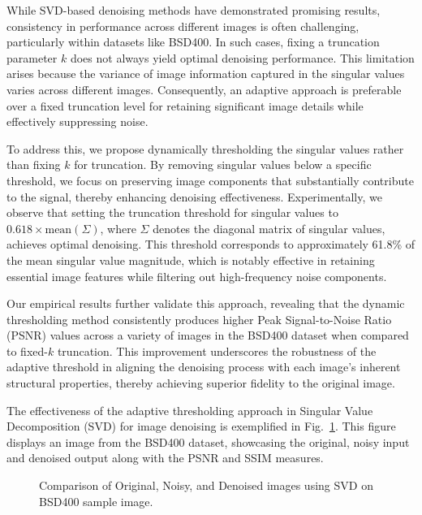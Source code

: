 \documentclass[
  journal,
]{IEEEtran}%
\begin{document}
While SVD-based denoising methods have demonstrated promising results,
consistency in performance across different images is often challenging,
particularly within datasets like BSD400. In such cases, fixing a
truncation parameter \(k\) does not always yield optimal denoising
performance. This limitation arises because the variance of image
information captured in the singular values varies across different
images. Consequently, an adaptive approach is preferable over a fixed
truncation level for retaining significant image details while
effectively suppressing noise.

To address this, we propose dynamically thresholding the singular values
rather than fixing \(k\) for truncation. By removing singular values
below a specific threshold, we focus on preserving image components that
substantially contribute to the signal, thereby enhancing denoising
effectiveness. Experimentally, we observe that setting the truncation
threshold for singular values to \(0.618 \times \text{mean}(\Sigma)\),
where \(\Sigma\) denotes the diagonal matrix of singular values,
achieves optimal denoising. This threshold corresponds to approximately
61.8\% of the mean singular value magnitude, which is notably effective
in retaining essential image features while filtering out high-frequency
noise components.

Our empirical results further validate this approach, revealing that the
dynamic thresholding method consistently produces higher Peak
Signal-to-Noise Ratio (PSNR) values across a variety of images in the
BSD400 dataset when compared to fixed-\(k\) truncation. This improvement
underscores the robustness of the adaptive threshold in aligning the
denoising process with each image's inherent structural properties,
thereby achieving superior fidelity to the original image.

The effectiveness of the adaptive thresholding approach in Singular
Value Decomposition (SVD) for image denoising is exemplified in
Fig.~\ref{fig-svd_denoising_resultsBSD}. This figure displays an image
from the BSD400 dataset, showcasing the original, noisy input and
denoised output along with the PSNR and SSIM measures.

\begin{figure}


\caption{\label{fig-svd_denoising_resultsBSD}Comparison of Original,
Noisy, and Denoised images using SVD on BSD400 sample image.}

\end{figure}%
\end{document}
